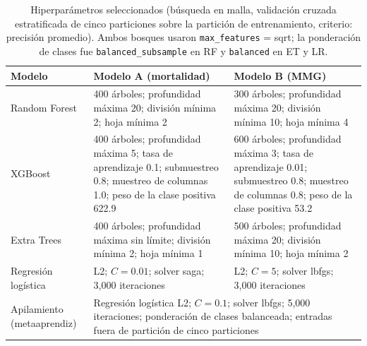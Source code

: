 \documentclass[healthcare,article,submit,pdftex,moreauthors]{Definitions/mdpi_es}
\begin{document}
\begin{table}[H]
\caption{Hiperparámetros seleccionados (búsqueda en malla, validación cruzada estratificada de cinco particiones sobre la partición de entrenamiento, criterio: precisión promedio).
Ambos bosques usaron \texttt{max\_features} = sqrt; la ponderación de clases fue \texttt{balanced\_subsample} en RF y \texttt{balanced} en ET y LR.\label{tab:hyper}}
\small
\begin{tabularx}{\textwidth}{lXX}
\toprule
\textbf{Modelo} & \textbf{Modelo A (mortalidad)} & \textbf{Modelo B (MMG)}\\
\midrule
Random Forest & 400 árboles; profundidad máxima 20; división mínima 2; hoja mínima 2 & 300 árboles; profundidad máxima 20; división mínima 10; hoja mínima 4\\
XGBoost & 400 árboles; profundidad máxima 5; tasa de aprendizaje 0.1; submuestreo 0.8; muestreo de columnas 1.0; peso de la clase positiva 622.9 & 600 árboles; profundidad máxima 3; tasa de aprendizaje 0.01; submuestreo 0.8; muestreo de columnas 0.8; peso de la clase positiva 53.2\\
Extra Trees & 400 árboles; profundidad máxima sin límite; división mínima 2; hoja mínima 1 & 500 árboles; profundidad máxima 20; división mínima 10; hoja mínima 2\\
Regresión logística & L2; $C=0.01$; solver saga; 3{,}000 iteraciones & L2; $C=5$; solver lbfgs; 3{,}000 iteraciones\\
Apilamiento (metaaprendiz) & \multicolumn{2}{p{0.6\textwidth}}{Regresión logística L2; $C=0.1$; solver lbfgs; 5{,}000 iteraciones; ponderación de clases balanceada; entradas fuera de partición de cinco particiones}\\
\bottomrule
\end{tabularx}
\end{table}
\end{document}
